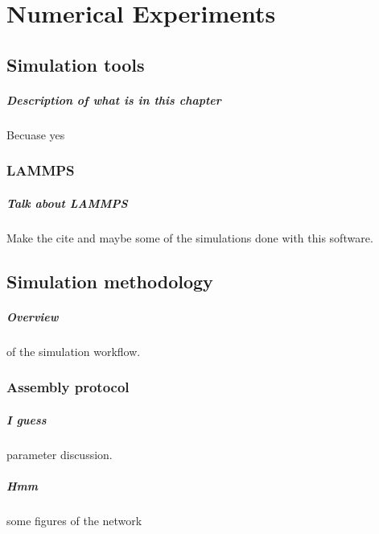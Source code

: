 


\chapter{Numerical Experiments}\label{ch3:NumExp}


\section{Simulation tools}

\paragraph{Description of what is in this chapter} Becuase yes

\subsection{LAMMPS}

\paragraph{Talk about LAMMPS} Make the cite and maybe some of the simulations done with this software.

\section{Simulation methodology}\label{ch3:SimProtocol}

\paragraph{Overview} of the simulation workflow.

\subsection{Assembly protocol}

\paragraph{I guess} parameter discussion.

\paragraph{Hmm} some figures of the network

